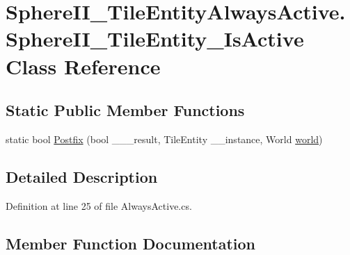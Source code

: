 \hypertarget{class_sphere_i_i___tile_entity_always_active_1_1_sphere_i_i___tile_entity___is_active}{}\section{Sphere\+I\+I\+\_\+\+Tile\+Entity\+Always\+Active.\+Sphere\+I\+I\+\_\+\+Tile\+Entity\+\_\+\+Is\+Active Class Reference}
\label{class_sphere_i_i___tile_entity_always_active_1_1_sphere_i_i___tile_entity___is_active}
\subsection*{Static Public Member Functions}
\begin{DoxyCompactItemize}
\item 
static bool \mbox{\hyperlink{class_sphere_i_i___tile_entity_always_active_1_1_sphere_i_i___tile_entity___is_active_aaa52b41dfadbdd5e908347ce56fd718d}{Postfix}} (bool \+\_\+\+\_\+\+\_\+result, Tile\+Entity \+\_\+\+\_\+instance, World \mbox{\hyperlink{_sphere_i_i_01_music_01_boxes_2_config_2_localization_8txt_a7ede01351426b1b7f6c1ce5f794e474f}{world}})
\end{DoxyCompactItemize}


\subsection{Detailed Description}


Definition at line 25 of file Always\+Active.\+cs.



\subsection{Member Function Documentation}
\mbox{\label{class_sphere_i_i___tile_entity_always_active_1_1_sphere_i_i___tile_entity___is_active_aaa52b41dfadbdd5e908347ce56fd718d}} 
